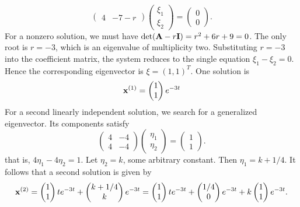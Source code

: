 \documentclass[11pt,a4paper]{article}
\begin{document}
\begin{enumerate}
$$\begin{pmatrix}
			4 & -7-r
		\end{pmatrix}
		\begin{pmatrix}
			\xi_1\\
			\xi_2
		\end{pmatrix} =
		\begin{pmatrix}
			0\\
			0
		\end{pmatrix}.
		$$
		For a nonzero solution, we must have $\det(\vb{A} - r\vb{I}) = r^2 + 6r + 9 = 0$. The only root is $r = −3$, which is an eigenvalue of multiplicity two. Substituting $r = −3$ into the coefficient matrix, the system reduces to the single equation $\xi_1 - \xi_2 = 0$. Hence the corresponding eigenvector is $\xi = (1, 1)^T$. One solution is
		$$
		\vb{x}^{(1)} =
		\begin{pmatrix}
			1\\
			1
		\end{pmatrix}e^{-3t}
		$$
		For a second linearly independent solution, we search for a generalized eigenvector. Its components satisfy
		$$
		\begin{pmatrix}
			4 & -4\\
			4 & -4
		\end{pmatrix}
		\begin{pmatrix}
			\eta_1\\
			\eta_2
		\end{pmatrix} =
		\begin{pmatrix}
			1\\
			1
		\end{pmatrix}.
		$$
		that is, $4\eta_1 - 4\eta_2 = 1$. Let $\eta_2 = k$, some arbitrary constant. Then $\eta_1 = k + 1/4$. It follows that a second solution is given by
		$$
		\vb{x}^{(2)} =
		\begin{pmatrix}
			1\\
			1
		\end{pmatrix}te^{-3t} +
		\begin{pmatrix}
			k+1/4\\
			k
		\end{pmatrix}e^{-3t} =
		\begin{pmatrix}
			1\\
			1
		\end{pmatrix}te^{-3t} +
		\begin{pmatrix}
			1/4\\
			0
		\end{pmatrix}e^{-3t} + k
		\begin{pmatrix}
			1\\
			1
		\end{pmatrix}e^{-3t}.
$$
\end{enumerate}
\end{document}
